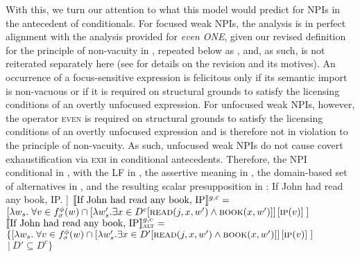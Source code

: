 With this, we turn our attention to what this model would predict for NPIs in the antecedent of conditionals. For focused weak NPIs, the analysis is in perfect alignment with the analysis provided for \textit{even \MakeUppercase{one}}, given our revised definition for the principle of non-vacuity in , repeated below as , and, as such, is not reiterated separately here (see  for details on the revision and its motives).
\ex{}
{}
An occurrence of a focus-sensitive expression is felicitous only if its semantic import is non-vacuous or if it is required on structural grounds to satisfy the licensing conditions of an overtly unfocused expression.
\xe
For unfocused weak NPIs, however, the operator {\scshape even} is required on structural grounds to satisfy the licensing conditions of an overtly unfocused expression and is therefore not in violation to the principle of non-vacuity. As such, unfocused weak NPIs do not cause covert exhaustification via {\scshape exh} in conditional antecedents. Therefore, the NPI conditional in , with the LF in , the assertive meaning in , the domain-based set of alternatives in , and the resulting scalar presupposition in :
\pex[nopreamble=true]\label{ex:ds-neutral-conditional-any}%
\a{} If John had read any book, IP.
\a[]\phantomsection [even\textsubscript{C} [If John had read any book, IP]]
\a{} $\intension[g,c]{If John had read any book, IP}=$\\$[\lambda w_s.\hspace{1mm}\forall v\in f^{\phi}_\sigma(w)\cap [\lambda w'_s.\exists{x\in{D^c}}[\predicate{read}(j,x,w')\land\predicate{book}(x,w')]]\hspace{0.5mm}[\predicate{ip}(v)]\hspace{1mm}]$
\a{} $\intension[g,c]{If John had read any book, IP}_{\text{\scshape alt}}=$\\$\{[\lambda w_s.\hspace{1mm}\forall v\in f^{\phi}_\sigma(w)\cap [\lambda w'_s.\exists{x\in{D'}}[\predicate{read}(j,x,w')\land\predicate{book}(x,w')]]\hspace{0.5mm}[\predicate{ip}(v)]\hspace{1mm}]$\\\emptyfill$~|~D'\subseteq D^c\}$

